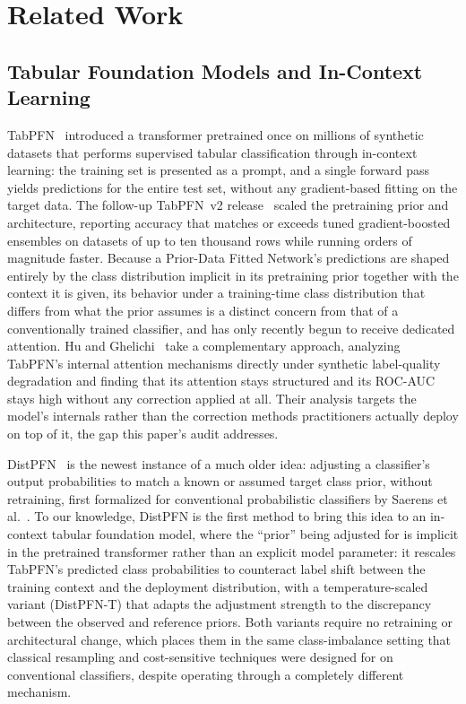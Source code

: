 \section{Related Work}
\label{sec:related-work}

\subsection{Tabular Foundation Models and In-Context Learning}

TabPFN~\cite{hollmann2023tabpfn} introduced a transformer pretrained once on
millions of synthetic datasets that performs supervised tabular classification
through in-context learning: the training set is presented as a prompt, and a
single forward pass yields predictions for the entire test set, without any
gradient-based fitting on the target data. The follow-up TabPFN~v2
release~\cite{hollmann2025tabpfnv2} scaled the pretraining prior and
architecture, reporting accuracy that matches or exceeds tuned gradient-boosted
ensembles on datasets of up to ten thousand rows while running orders of
magnitude faster. Because a Prior-Data Fitted Network's predictions are shaped
entirely by the class distribution implicit in its pretraining prior together
with the context it is given, its behavior under a training-time class
distribution that differs from what the prior assumes is a distinct concern
from that of a conventionally trained classifier, and has only recently begun
to receive dedicated attention. Hu and Ghelichi~\cite{hu2026noiseimmunity}
take a complementary approach, analyzing TabPFN's internal attention
mechanisms directly under synthetic label-quality degradation and finding
that its attention stays structured and its ROC-AUC stays high without any
correction applied at all. Their analysis targets the model's internals
rather than the correction methods practitioners actually deploy on top of
it, the gap this paper's audit addresses.

DistPFN~\cite{lee2026distpfn} is the newest instance of a much older idea:
adjusting a classifier's output probabilities to match a known or assumed
target class prior, without retraining, first formalized for conventional
probabilistic classifiers by Saerens et al.~\cite{saerens2002adjusting}. To
our knowledge, DistPFN is the first method to bring this idea to an
in-context tabular foundation model, where the ``prior'' being adjusted for
is implicit in the pretrained transformer rather than an explicit model
parameter: it rescales TabPFN's predicted class probabilities to counteract
label shift between the training context and the deployment distribution,
with a temperature-scaled variant (DistPFN-T) that adapts the adjustment
strength to the discrepancy between the observed and reference priors. Both
variants require no retraining or architectural change, which places them in
the same class-imbalance setting that classical resampling and
cost-sensitive techniques were designed for on conventional classifiers,
despite operating through a completely different mechanism.

